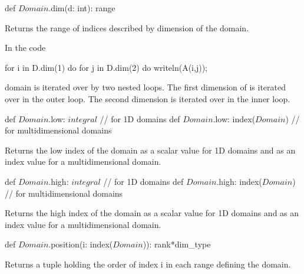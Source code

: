 \begin{protohead}
def $Domain$.dim(d: int): range
\end{protohead}
\begin{protobody}
Returns the range of indices described by dimension  of the
domain.
\end{protobody}

\begin{example}
In the code
\begin{chapel}
for i in D.dim(1) do
  for j in D.dim(2) do
    writeln(A(i,j));
\end{chapel}
domain  is iterated over by two nested loops.  The first
dimension of  is iterated over in the outer loop.  The second
dimension is iterated over in the inner loop.
\end{example}


\begin{protohead}
def $Domain$.low: $integral$        // for 1D domains
def $Domain$.low: index($Domain$)   // for multidimensional domains
\end{protohead}
\begin{protobody}
Returns the low index of the domain as a scalar value for 1D domains
and as an index value for a multidimensional domain.
\end{protobody}

\begin{protohead}
def $Domain$.high: $integral$        // for 1D domains
def $Domain$.high: index($Domain$)   // for multidimensional domains
\end{protohead}
\begin{protobody}
Returns the high index of the domain as a scalar value for 1D domains
and as an index value for a multidimensional domain.
\end{protobody}

\begin{protohead}
def $Domain$.position(i: index($Domain$)): rank*dim_type
\end{protohead}
\begin{protobody}
Returns a tuple holding the order of index i in each range defining
the domain.
\end{protobody}


%
